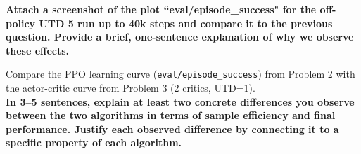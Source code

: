 \documentclass[12pt]{article}
\begin{document}
\newpage



\noindent\textbf{\color{red}Attach a screenshot of the plot ``eval/episode\_success" for the off-policy UTD 5 run up to 40k steps and compare it to the previous question. Provide a brief, one-sentence explanation of why we observe these effects.}

\newpage



\noindent Compare the PPO learning curve (\texttt{eval/episode\_success}) from Problem 2 with the actor-critic curve from Problem 3 (2 critics, UTD=1). \\
 
\noindent \textbf{\color{red}In 3--5 sentences, explain at least two concrete differences you observe between the two algorithms in terms of sample efficiency and final performance. Justify each observed difference by connecting it to a specific property of each algorithm.}



%
%
\end{document}

